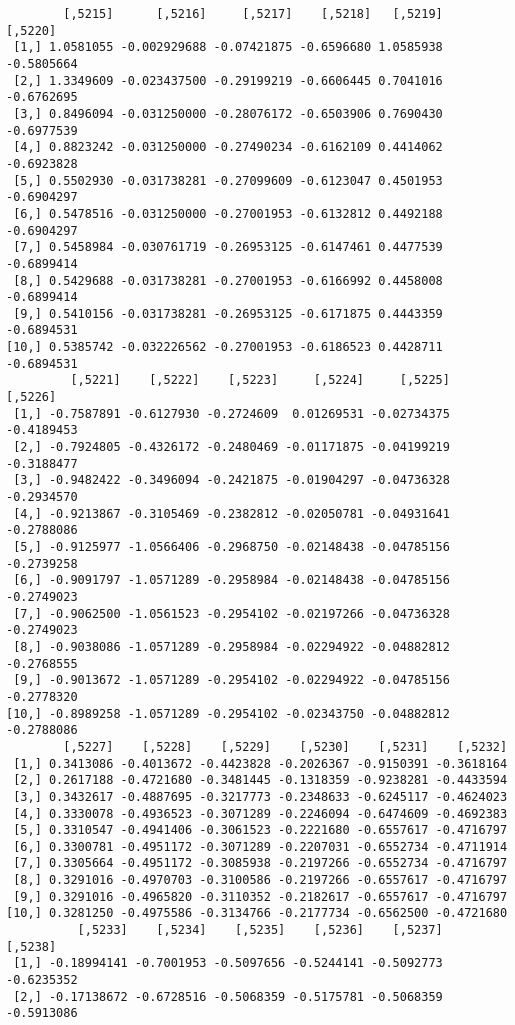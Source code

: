\documentclass[
  letterpaper,
  DIV=11,
  numbers=noendperiod]{scrreprt}
\begin{document}
\begin{verbatim}
        [,5215]      [,5216]     [,5217]    [,5218]   [,5219]    [,5220]
 [1,] 1.0581055 -0.002929688 -0.07421875 -0.6596680 1.0585938 -0.5805664
 [2,] 1.3349609 -0.023437500 -0.29199219 -0.6606445 0.7041016 -0.6762695
 [3,] 0.8496094 -0.031250000 -0.28076172 -0.6503906 0.7690430 -0.6977539
 [4,] 0.8823242 -0.031250000 -0.27490234 -0.6162109 0.4414062 -0.6923828
 [5,] 0.5502930 -0.031738281 -0.27099609 -0.6123047 0.4501953 -0.6904297
 [6,] 0.5478516 -0.031250000 -0.27001953 -0.6132812 0.4492188 -0.6904297
 [7,] 0.5458984 -0.030761719 -0.26953125 -0.6147461 0.4477539 -0.6899414
 [8,] 0.5429688 -0.031738281 -0.27001953 -0.6166992 0.4458008 -0.6899414
 [9,] 0.5410156 -0.031738281 -0.26953125 -0.6171875 0.4443359 -0.6894531
[10,] 0.5385742 -0.032226562 -0.27001953 -0.6186523 0.4428711 -0.6894531
         [,5221]    [,5222]    [,5223]     [,5224]     [,5225]    [,5226]
 [1,] -0.7587891 -0.6127930 -0.2724609  0.01269531 -0.02734375 -0.4189453
 [2,] -0.7924805 -0.4326172 -0.2480469 -0.01171875 -0.04199219 -0.3188477
 [3,] -0.9482422 -0.3496094 -0.2421875 -0.01904297 -0.04736328 -0.2934570
 [4,] -0.9213867 -0.3105469 -0.2382812 -0.02050781 -0.04931641 -0.2788086
 [5,] -0.9125977 -1.0566406 -0.2968750 -0.02148438 -0.04785156 -0.2739258
 [6,] -0.9091797 -1.0571289 -0.2958984 -0.02148438 -0.04785156 -0.2749023
 [7,] -0.9062500 -1.0561523 -0.2954102 -0.02197266 -0.04736328 -0.2749023
 [8,] -0.9038086 -1.0571289 -0.2958984 -0.02294922 -0.04882812 -0.2768555
 [9,] -0.9013672 -1.0571289 -0.2954102 -0.02294922 -0.04785156 -0.2778320
[10,] -0.8989258 -1.0571289 -0.2954102 -0.02343750 -0.04882812 -0.2788086
        [,5227]    [,5228]    [,5229]    [,5230]    [,5231]    [,5232]
 [1,] 0.3413086 -0.4013672 -0.4423828 -0.2026367 -0.9150391 -0.3618164
 [2,] 0.2617188 -0.4721680 -0.3481445 -0.1318359 -0.9238281 -0.4433594
 [3,] 0.3432617 -0.4887695 -0.3217773 -0.2348633 -0.6245117 -0.4624023
 [4,] 0.3330078 -0.4936523 -0.3071289 -0.2246094 -0.6474609 -0.4692383
 [5,] 0.3310547 -0.4941406 -0.3061523 -0.2221680 -0.6557617 -0.4716797
 [6,] 0.3300781 -0.4951172 -0.3071289 -0.2207031 -0.6552734 -0.4711914
 [7,] 0.3305664 -0.4951172 -0.3085938 -0.2197266 -0.6552734 -0.4716797
 [8,] 0.3291016 -0.4970703 -0.3100586 -0.2197266 -0.6557617 -0.4716797
 [9,] 0.3291016 -0.4965820 -0.3110352 -0.2182617 -0.6557617 -0.4716797
[10,] 0.3281250 -0.4975586 -0.3134766 -0.2177734 -0.6562500 -0.4721680
          [,5233]    [,5234]    [,5235]    [,5236]    [,5237]    [,5238]
 [1,] -0.18994141 -0.7001953 -0.5097656 -0.5244141 -0.5092773 -0.6235352
 [2,] -0.17138672 -0.6728516 -0.5068359 -0.5175781 -0.5068359 -0.5913086

\end{verbatim}
\end{document}
